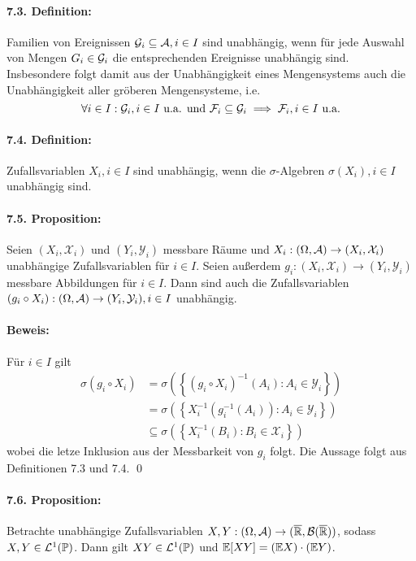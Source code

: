 \documentclass[12pt]{report}
\begin{document}
\paragraph{7.3. Definition:}Familien von Ereignissen $\mathcal{G}_i\subseteq\mathcal{A},i\in I$ sind unabh\"angig, wenn f\"ur jede Auswahl von Mengen $G_i\in\mathcal{G}_i$ die entsprechenden Ereignisse unabh\"angig sind. Insbesondere folgt damit aus der Unabh\"angigkeit eines Mengensystems auch die Unabh\"angigkeit aller gr\"oberen Mengensysteme, i.e.
$$\forall i\in I:\mathcal{G}_i,i\in I\text{ u.a. und }\mathcal{F}_i\subseteq\mathcal{G}_i\implies \mathcal{F}_i,i\in I\text{ u.a.}$$

\paragraph{7.4. Definition:}Zufallsvariablen $X_i,i\in I$ sind unabh\"angig, wenn die $\sigma$-Algebren $\sigma(X_i),i\in I$ unabh\"angig sind.

\paragraph{7.5. Proposition:}Seien $(X_i,\mathcal{X}_i)$ und $(Y_i,\mathcal{Y}_i)$ messbare R\"aume und $X_i:(\Omega,\mathcal{A})\to(X_i,\mathcal{X}_i)$ unabh\"angige Zufallsvariablen f\"ur $i\in I$. Seien au\ss{}erdem $g_i:(X_i,\mathcal{X}_i)\to(Y_i,\mathcal{Y}_i)$ messbare Abbildungen f\"ur $i\in I$. Dann sind auch die Zufallsvariablen $(g_i\circ X_i):(\Omega,\mathcal{A})\to(Y_i,\mathcal{Y}_i), i\in I$ unabh\"angig. 

\paragraph{Beweis:}F\"ur $i\in I$ gilt
\begin{align*}
    \sigma(g_i\circ X_i)&=\sigma\left(\left\{(g_i\circ X_i)^{-1}(A_i):A_i\in\mathcal{Y}_i\right\}\right)\\
    &=\sigma\left(\left\{X_i^{-1}\left(g_i^{-1}(A_i)\right):A_i\in\mathcal{Y}_i\right\}\right)\\
    &\subseteq\sigma\left(\left\{X_i^{-1}\left(B_i\right):B_i\in\mathcal{X}_i\right\}\right)
\end{align*}
wobei die letze Inklusion aus der Messbarkeit von $g_i$ folgt. Die Aussage folgt aus Definitionen 7.3 und 7.4. \qed

\paragraph{7.6. Proposition:}Betrachte unabh\"angige Zufallsvariablen $X,Y:(\Omega,\mathcal{A})\to(\overline{\mathbb{R}},\mathcal{B}(\overline{\mathbb{R}}))$, sodass $X,Y\in\mathcal{L}^1(\mathbb{P})$. Dann gilt $XY\in\mathcal{L}^1(\mathbb{P})$ und $\mathbb{E}[XY]=(\mathbb{E} X)\cdot (\mathbb{E} Y)$.
\end{document}
